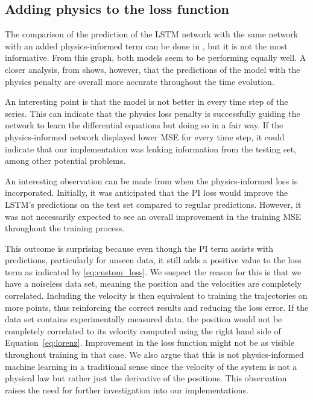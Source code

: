 \subsection{Adding physics to the loss function}

The comparison of the prediction of the LSTM network with the same network with an added physics-informed term can be done in , but it is not the most informative. From this graph, both models seem to be performing equally well. A closer analysis, from  shows, however, that the predictions of the model with the physics penalty are overall more accurate throughout the time evolution.

An interesting point is that the model is not better in every time step of the series. This can indicate that the physics loss penalty is successfully guiding the network to learn the differential equations but doing so in a fair way. If the physics-informed network displayed lower MSE for every time step, it could indicate that our implementation was leaking information from the testing set, among other potential problems.

An interesting observation can be made from  when the physics-informed loss is incorporated. Initially, it was anticipated that the PI loss would improve the LSTM's predictions on the test set compared to regular predictions. However, it was not necessarily expected to see an overall improvement in the training MSE throughout the training process.

This outcome is surprising because even though the PI term assists with predictions, particularly for unseen data, it still adds a positive value to the loss term as indicated by \eqref{eq:custom_loss}. 
We suspect the reason for this is that we have a noiseless data set, meaning the position and the velocities are completely correlated. Including the velocity is then equivalent to training the trajectories on more points, thus reinforcing the correct results and reducing the loss error. If the data set contains experimentally measured data, the position would not be completely correlated to its velocity computed using the right hand side of Equation~\eqref{eq:lorenz}. Improvement in the loss function might not be as visible throughout training in that case. We also argue that this is not physics-informed machine learning in a traditional sense since the velocity of the system is not a physical law but rather just the derivative of the positions. This observation raises the need for further investigation into our implementations.


